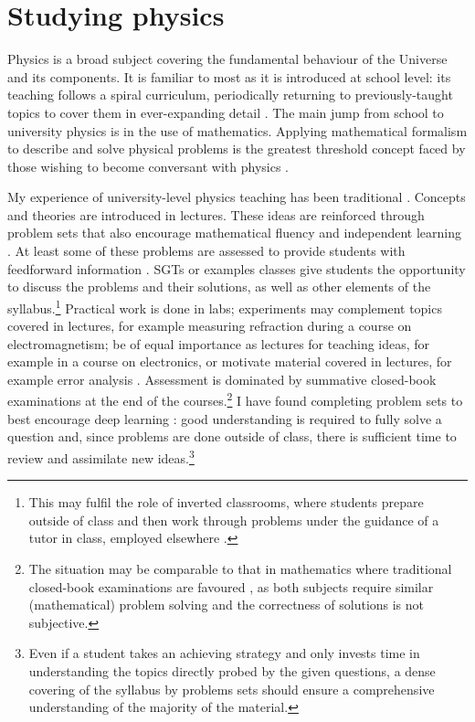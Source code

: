 \section{Studying physics}\label{sec:physics}

Physics is a broad subject covering the fundamental behaviour of the Universe and its components. It is familiar to most as it is introduced at school level: its teaching follows a spiral curriculum, periodically returning to previously-taught topics to cover them in ever-expanding detail \citep{Bruner1960}. The main jump from school to university physics is in the use of mathematics. Applying mathematical formalism to describe and solve physical problems is the greatest threshold concept \citep{Meyer2003} faced by those wishing to become conversant with physics \citep{Wigner1960}.

My experience of university-level physics teaching has been traditional \citep[cf.][]{Iannone2015}. Concepts and theories are introduced in lectures. These ideas are reinforced through problem sets that also encourage mathematical fluency and independent learning \citep{Pike2015}. At least some of these problems are assessed to provide students with feedforward information \citep{Bloxham2015}. SGTs or examples classes give students the opportunity to discuss the problems and their solutions, as well as other elements of the syllabus.\footnote{This may fulfil the role of inverted classrooms, where students prepare outside of class and then work through problems under the guidance of a tutor in class, employed elsewhere \citep{Lage2000}.} Practical work is done in labs; experiments may complement topics covered in lectures, for example measuring refraction during a course on electromagnetism; be of equal importance as lectures for teaching ideas, for example in a course on electronics, or motivate material covered in lectures, for example error analysis \citep{Hanif2009}. Assessment is dominated by summative closed-book examinations at the end of the courses.\footnote{The situation may be comparable to that in mathematics where traditional closed-book examinations are favoured \citep{Iannone2014}, as both subjects require similar (mathematical) problem solving and the correctness of solutions is not subjective.} I have found completing problem sets to best encourage deep learning \citep{Marton1976,Marton1976a}: good understanding is required to fully solve a question and, since problems are done outside of class, there is sufficient time to review and assimilate new ideas.\footnote{Even if a student takes an achieving strategy \citep[chapter 2]{Biggs1987} and only invests time in understanding the topics directly probed by the given questions, a dense covering of the syllabus by problems sets should ensure a comprehensive understanding of the majority of the material.}


